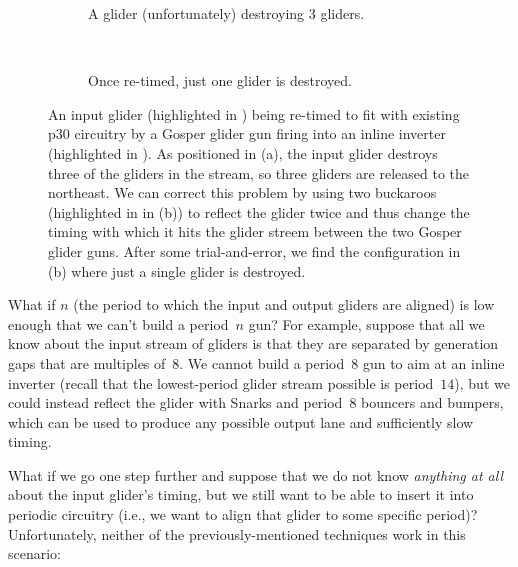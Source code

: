 \begin{figure}[!htb]
	\centering
	\begin{subfigure}{.49\textwidth}
		\centering
		\caption{A glider (unfortunately) destroying $3$ gliders.}
		\label{fig:inverter_as_regulator_0}
	\end{subfigure} \ \ \ %
	\begin{subfigure}{.48\textwidth}
		\centering
		\caption{Once re-timed, just one glider is destroyed.}
		\label{fig:inverter_as_regulator_1}
	\end{subfigure}
	\caption{An input glider (highlighted in ) being re-timed to fit with existing p$30$ circuitry by a Gosper glider gun firing into an inline inverter (highlighted in ). As positioned in (a), the input glider destroys three of the gliders in the stream, so three gliders are released to the northeast. We can correct this problem by using two buckaroos (highlighted in  in (b)) to reflect the glider twice and thus change the timing with which it hits the glider streem between the two Gosper glider guns. After some trial-and-error, we find the configuration in (b) where just a single glider is destroyed.}\label{fig:inverter_as_regulator}
\end{figure}

What if $n$ (the period to which the input and output gliders are aligned) is low enough that we can't build a period~$n$ gun? For example, suppose that all we know about the input stream of gliders is that they are separated by generation gaps that are multiples of~$8$. We cannot build a period~$8$ gun to aim at an inline inverter (recall that the lowest-period glider stream possible is period~$14$), but we could instead reflect the glider with Snarks and period~$8$ bouncers and bumpers, which can be used to produce any possible output lane and sufficiently slow timing.

What if we go one step further and suppose that we do not know \emph{anything at all} about the input glider's timing, but we still want to be able to insert it into periodic circuitry (i.e., we want to align that glider to some specific period)? Unfortunately, neither of the previously-mentioned techniques work in this scenario:\smallskip

